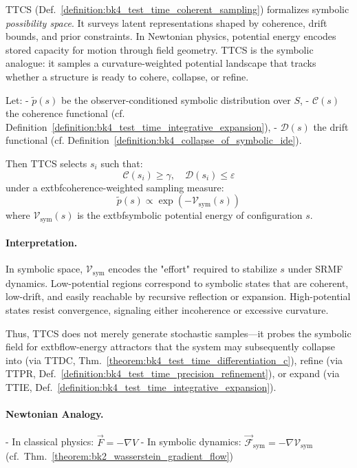 \begin{scholium}
\label{scholium:bk4_ttcs_potential_field}
TTCS (Def.~\ref{definition:bk4_test_time_coherent_sampling}) formalizes symbolic
\emph{possibility space}. It surveys latent representations shaped by
coherence, drift bounds, and prior constraints.
In Newtonian physics, potential energy encodes stored capacity for motion
through field geometry. TTCS is the symbolic analogue: it samples a
curvature-weighted potential landscape that tracks whether a structure is ready
to cohere, collapse, or refine.

Let:
- $\tilde{p}(s)$ be the observer-conditioned symbolic distribution over $S$,
- $\mathcal{C}(s)$ the coherence functional (cf. Definition~\ref{definition:bk4_test_time_integrative_expansion}),
- $\mathcal{D}(s)$ the drift functional (cf. Definition~\ref{definition:bk4_collapse_of_symbolic_ide}).

Then TTCS selects $s_i$ such that:
\[
\mathcal{C}(s_i) \geq \gamma, \quad \mathcal{D}(s_i) \leq \varepsilon
\]
under a 	extbf{coherence-weighted sampling measure}:
\[
\tilde{p}(s) \propto \exp\left( -\mathcal{V}_{\text{sym}}(s) \right)
\]
where $\mathcal{V}_{\text{sym}}(s)$ is the 	extbf{symbolic potential energy} of configuration $s$.

\paragraph{Interpretation.} In symbolic space, $\mathcal{V}_{\text{sym}}$ encodes the "effort" required to stabilize $s$ under SRMF dynamics. Low-potential regions correspond to symbolic states that are coherent, low-drift, and easily reachable by recursive reflection or expansion. High-potential states resist convergence, signaling either incoherence or excessive curvature.

Thus, TTCS does not merely generate stochastic samples---it probes the symbolic field for 	extbf{low-energy attractors} that the system may subsequently collapse into (via TTDC, Thm.~\ref{theorem:bk4_test_time_differentiation_c}), refine (via TTPR, Def.~\ref{definition:bk4_test_time_precision_refinement}), or expand (via TTIE, Def.~\ref{definition:bk4_test_time_integrative_expansion}).

\paragraph{Newtonian Analogy.}
- In classical physics: $\vec{F} = -\nabla V$
- In symbolic dynamics: $\vec{\mathcal{F}}_{\text{sym}} = -\nabla \mathcal{V}_{\text{sym}}$ (cf.~Thm.~\ref{theorem:bk2_wasserstein_gradient_flow})


\end{scholium}
